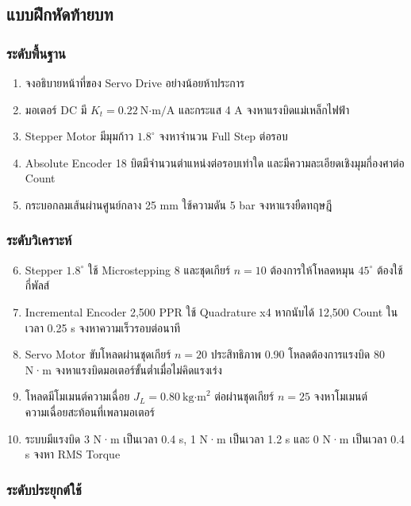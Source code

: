 \subsection{แบบฝึกหัดท้ายบท}

\subsubsection{ระดับพื้นฐาน}

\begin{enumerate}
    \item จงอธิบายหน้าที่ของ Servo Drive อย่างน้อยห้าประการ
    \item มอเตอร์ DC มี $K_t=0.22\ \text{N·m/A}$ และกระแส 4 A จงหาแรงบิดแม่เหล็กไฟฟ้า
    \item Stepper Motor มีมุมก้าว $1.8^\circ$ จงหาจำนวน Full Step ต่อรอบ
    \item Absolute Encoder 18 บิตมีจำนวนตำแหน่งต่อรอบเท่าใด และมีความละเอียดเชิงมุมกี่องศาต่อ Count
    \item กระบอกลมเส้นผ่านศูนย์กลาง 25 mm ใช้ความดัน 5 bar จงหาแรงยืดทฤษฎี
\end{enumerate}

\subsubsection{ระดับวิเคราะห์}

\begin{enumerate}
    \setcounter{enumi}{5}
    \item Stepper $1.8^\circ$ ใช้ Microstepping 8 และชุดเกียร์ $n=10$ ต้องการให้โหลดหมุน $45^\circ$ ต้องใช้กี่พัลส์
    \item Incremental Encoder 2,500 PPR ใช้ Quadrature x4 หากนับได้ 12,500 Count ในเวลา 0.25 s จงหาความเร็วรอบต่อนาที
    \item Servo Motor ขับโหลดผ่านชุดเกียร์ $n=20$ ประสิทธิภาพ 0.90 โหลดต้องการแรงบิด 80 N·m จงหาแรงบิดมอเตอร์ขั้นต่ำเมื่อไม่คิดแรงเร่ง
    \item โหลดมีโมเมนต์ความเฉื่อย $J_L=0.80\ \text{kg·m}^2$ ต่อผ่านชุดเกียร์ $n=25$ จงหาโมเมนต์ความเฉื่อยสะท้อนที่เพลามอเตอร์
    \item ระบบมีแรงบิด 3 N·m เป็นเวลา 0.4 s, 1 N·m เป็นเวลา 1.2 s และ 0 N·m เป็นเวลา 0.4 s จงหา RMS Torque
\end{enumerate}

\subsubsection{ระดับประยุกต์ใช้}

